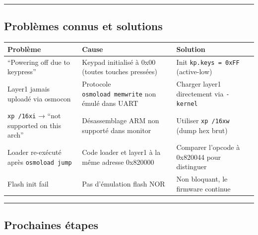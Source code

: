 \documentclass[
]{article}
\begin{document}
\begin{center}\rule{0.5\linewidth}{0.5pt}\end{center}

\subsection{Problèmes connus et
solutions}\label{probluxe8mes-connus-et-solutions}

\begin{longtable}[]{@{}
  >{\raggedright\arraybackslash}p{}
  >{\raggedright\arraybackslash}p{}
  >{\raggedright\arraybackslash}p{}@{}}
\toprule\noalign{}
\begin{minipage}[b]{\linewidth}\raggedright
Problème
\end{minipage} & \begin{minipage}[b]{\linewidth}\raggedright
Cause
\end{minipage} & \begin{minipage}[b]{\linewidth}\raggedright
Solution
\end{minipage} \\
\midrule\noalign{}
\endhead
\bottomrule\noalign{}
\endlastfoot
``Powering off due to keypress'' & Keypad initialisé à 0x00 (toutes
touches pressées) & Init \texttt{kp.keys\ =\ 0xFF} (active-low) \\
Layer1 jamais uploadé via osmocon & Protocole
\texttt{osmoload\ memwrite} non émulé dans UART & Charger layer1
directement via \texttt{-kernel} \\
\texttt{xp\ /16xi} → ``not supported on this arch'' & Désassemblage ARM
non supporté dans monitor & Utiliser \texttt{xp\ /16xw} (dump hex
brut) \\
Loader re-exécuté après \texttt{osmoload\ jump} & Code loader et layer1
à la même adresse 0x820000 & Comparer l'opcode à 0x820044 pour
distinguer \\
Flash init fail & Pas d'émulation flash NOR & Non bloquant, le firmware
continue \\
\end{longtable}

\begin{center}\rule{0.5\linewidth}{0.5pt}\end{center}

\subsection{Prochaines étapes}\label{prochaines-uxe9tapes}
\end{document}
